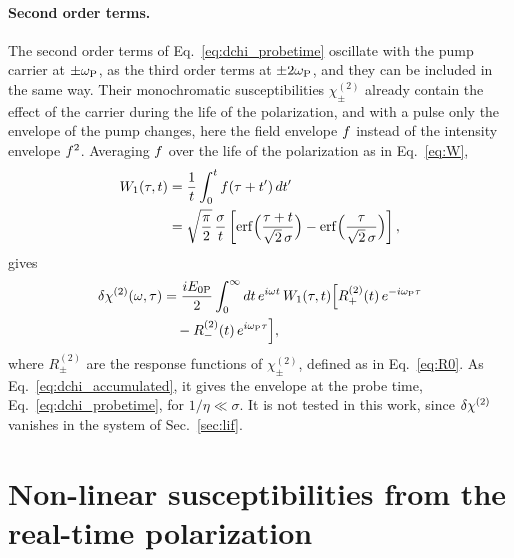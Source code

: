 \documentclass[aps,prb,reprint,superscriptaddress,amsmath,amssymb]{revtex4-2}
\begin{document}
\paragraph*{Second order terms.} The second order terms of Eq.~\eqref{eq:dchi_probetime} oscillate with the pump
carrier at $\pm\omega_{\mathrm{P}}$, as the third order terms at $\pm2\omega_{\mathrm{P}}$, and they can be included in the same way. Their
monochromatic susceptibilities $\chi^{(2)}_\pm$ already contain the effect of the carrier during the life of the
polarization, and with a pulse only the envelope of the pump changes, here the field envelope $f$ instead of the
intensity envelope $f^2$. Averaging $f$ over the life of the polarization as in Eq.~\eqref{eq:W},
\begin{align}
W_1(\tau,t) &= \frac{1}{t}\int_0^tf(\tau+t')\,dt' \nonumber\\
&= \sqrt{\frac{\pi}{2}}\,\frac{\sigma}{t}\left[\mathrm{erf}\Big(\frac{\tau+t}{\sqrt{2}\,\sigma}\Big)
-\mathrm{erf}\Big(\frac{\tau}{\sqrt{2}\,\sigma}\Big)\right] ,
\label{eq:W1}
\end{align}
gives
\begin{align}
\delta\chi^{(2)}(\omega,\tau) &= \frac{iE_{0\mathrm{P}}}{2}\int_0^\infty dt\,e^{i\omega t}\,W_1(\tau,t)
\Big[R^{(2)}_+(t)\,e^{-i\omega_{\mathrm{P}}\tau} \nonumber\\
&\quad - R^{(2)}_-(t)\,e^{i\omega_{\mathrm{P}}\tau}\Big] ,
\label{eq:dchi2_accumulated}
\end{align}
where $R^{(2)}_\pm$ are the response functions of $\chi^{(2)}_\pm$, defined as in Eq.~\eqref{eq:R0}. As
Eq.~\eqref{eq:dchi_accumulated}, it gives the envelope at the probe time, Eq.~\eqref{eq:dchi_probetime}, for
$1/\eta\ll\sigma$. It is not tested in this work, since $\delta\chi^{(2)}$ vanishes in
the system of Sec.~\ref{sec:lif}.

\section{Non-linear susceptibilities from the real-time polarization}
\label{app:extraction}




\end{document}
